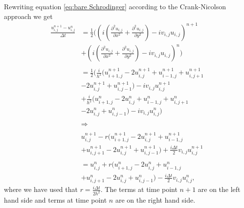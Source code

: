\documentclass[english,notitlepage,reprint,nofootinbib]{revtex4-2}  %
\begin{document}
	\noindent
	Rewriting equation \ref{eq:bare Schrodinger}
	according to the Crank-Nicolson approach we get 
	\begin{equation}\label{eq:algo}
		\begin{aligned}
		\frac{u^{n+1}_{i,j}-u^{n}_{i,j}}{\Delta t} &=  \frac{1}{2}\Big(\left(i\left(\frac{\partial^2 u_{i,j}}{\partial x^2} + \frac{\partial^2 u_{i,j}}{\partial y^2}\right) -i v_{i,j} u_{i,j}\right)^{n+1} \\
	    &+   \left(i(\frac{\partial^2 u_{i,j}}{\partial x^2} + \frac{\partial^2 u_{i,j}}{\partial y^2}) -i v_{i,j} u_{i,j}\right)^{n} \Big)\\
	    &\ \\
		&=  \frac{1}{2}\Big(    \frac{i}{h^2}\big(  u^{n+1}_{i+1,j}-2u^{n+1}_{i,j}+u^{n+1}_{i-1,j}   +u^{n+1}_{i,j+1}\\
		&-2u^{n+1}_{i,j}+u^{n+1}_{i,j-1}\big)-iv_{i,j}u^{n+1}_{i,j}\\
		&+ \frac{i}{h^2}\big(  u^{n}_{i+1,j}-2u^{n}_{i,j}+u^{n}_{i-1,j}   +u^{n}_{i,j+1}\\
		&-2u^{n}_{i,j}+u^{n}_{i,j-1}\big)-iv_{i,j}u^{n}_{i,j}      \Big)\\ 
		&\ \\
		&\Rightarrow \\ 
		&\ \\
		&u^{n+1}_{i,j} -r\Big(  u^{n+1}_{i+1,j}-2u^{n+1}_{i,j}+u^{n+1}_{i-1,j} \\
		&+u^{n+1}_{i,j+1}-2u^{n+1}_{i,j}+u^{n+1}_{i,j-1}\Big) +\frac{i\Delta t}{2}v_{i,j}u^{n+1}_{i,j}\\
		&\ \\
		&= u^n_{i,j}+ r\Big(  u^{n}_{i+1,j}-2u^{n}_{i,j}+u^{n}_{i-1,j}\\
		&+u^{n}_{i,j+1}-2u^{n}_{i,j}+u^{n}_{i,j-1}\Big)-\frac{i\Delta t}{2}v_{i,j}u^{n}_{i,j},
		\end{aligned}
	\end{equation}
	\noindent
	where we have used that $r = \frac{i\Delta t}{2h^2}$. The terms at time
	point $n+1$ are on the left hand side and terms at time point $n$ are on the right
	hand side.\\
	
\end{document}
